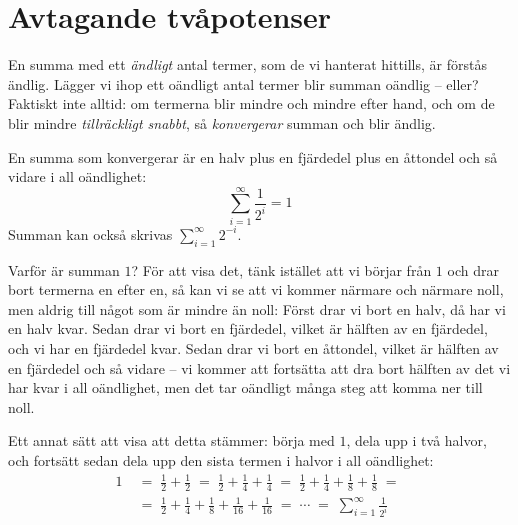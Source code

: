 \documentclass[a4paper]{article}
\begin{document}
\section*{Avtagande tvåpotenser}
\label{sec:org2f6e8a9}

En summa med ett \emph{ändligt} antal termer, som de vi hanterat hittills, är förstås
ändlig. Lägger vi ihop ett oändligt antal termer blir summan oändlig – eller?
Faktiskt inte alltid: om termerna blir mindre och mindre efter hand, och om de
blir mindre \emph{tillräckligt snabbt}, så \emph{konvergerar} summan och blir ändlig.

En summa som konvergerar är en halv plus en fjärdedel plus en åttondel och så vidare i all oändlighet:
\[\sum_{i=1}^{\infty} \frac{1}{2^i} = 1\]
Summan kan också skrivas \(\sum_{i=1}^{\infty} 2^{-i}\).

Varför är summan \(1\)? För att visa det, tänk istället att vi börjar från \(1\) och
drar bort termerna en efter en, så kan vi se att vi kommer närmare och närmare
noll, men aldrig till något som är mindre än noll: Först drar vi bort en halv,
då har vi en halv kvar. Sedan drar vi bort en fjärdedel, vilket är hälften av en
fjärdedel, och vi har en fjärdedel kvar. Sedan drar vi bort en åttondel, vilket
är hälften av en fjärdedel och så vidare – vi kommer att fortsätta att dra bort
hälften av det vi har kvar i all oändlighet, men det tar oändligt många steg att
komma ner till noll.

Ett annat sätt att visa att detta stämmer: börja med \(1\), dela upp i två halvor,
och fortsätt sedan dela upp den sista termen i halvor i all oändlighet:
\[\begin{split}
1 \; &=\; \frac{1}{2} + \frac{1}{2} \;=\; \frac{1}{2} +\frac{1}{4} +
\frac{1}{4} \;=\; \frac{1}{2} + \frac{1}{4} +
\frac{1}{8}+ \frac{1}{8} \;=\; \\
&=\; \frac{1}{2} + \frac{1}{4} +
\frac{1}{8}+ \frac{1}{16}+ \frac{1}{16} \;=\; \cdots \;=\; \sum_{i=1}^{\infty} \frac{1}{2^i}
\end{split}\]
\end{document}
